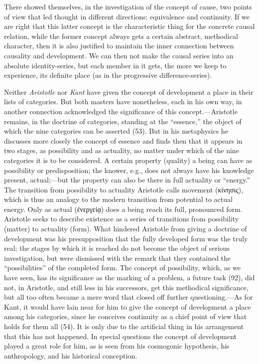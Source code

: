\documentclass[12pt,a4paper]{book}
\newcommand{\opage}[1]{\marginnote{\footnotesize\textit{[#1]}}}
\begin{document}
There showed themselves, in the investigation of the concept of cause, two
points of view that led thought in different directions: equivalence and
continuity. If we are right that this latter concept is the characteristic
thing for the concrete causal relation, while the former concept always gets
a certain abstract, methodical character, then it is also justified to
maintain the inner connection between causality and development. We can then
not make the causal series into an absolute identity-series, but each member
in it gets, the more we keep to experience, its definite place (as in the
progressive difference-series).

Neither \emph{Aristotle} nor \emph{Kant} have given the concept of
development a place in their lists of categories. But both masters have
nonetheless, each in his own way, in another connection acknowledged the
significance of this concept.---Aristotle remains, in the doctrine of
categories, standing at the ``essence,'' the object of which the nine
categories can be asserted (53). But in his metaphysics he discusses more
closely the concept of essence and finds then that it appears in two stages,
as possibility and as actuality, no matter under which of the nine categories
it is to be considered. A certain property (quality) a being can have as
possibility or predisposition; the knower, e.g., does not always have his
knowledge present, actual;---but the property can also be there in full
actuality or ``energy.'' The transition from possibility to actuality
Aristotle calls movement (κίνησις), which is thus an analogy to the modern
transition \opage{229}from potential to actual energy. Only as actual (ἐνεργείᾳ) does a
being reach its full, pronounced form. Aristotle seeks to describe existence
as a series of transitions from possibility (matter) to actuality (form).
What hindered Aristotle from giving a doctrine of development was his
presupposition that the fully developed form was the truly real; the stages
by which it is reached do not become the object of serious investigation, but
were dismissed with the remark that they contained the ``possibilities'' of
the completed form. The concept of possibility, which, as we have seen, has
its significance as the marking of a problem, a future task (92), did not, in
Aristotle, and still less in his successors, get this methodical
significance, but all too often became a mere word that closed off further
questioning.---As for Kant, it would have lain near for him to give the
concept of development a place among his categories, since he conceives
continuity as a chief point of view that holds for them all (54). It is only
due to the artificial thing in his arrangement that this has not happened. In
special questions the concept of development played a great role for him, as
is seen from his cosmogonic hypothesis, his anthropology, and his historical
conception.
\end{document}
